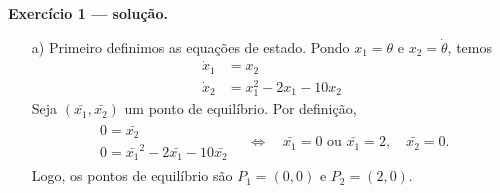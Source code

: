 \noindent
\textbf{\sffamily Exercício 1 --- solução.}
\begin{itemize}
	\item [a)] 
	Primeiro definimos as equações de estado. 
	Pondo 
	$x_1 = \theta$ e 
	$x_2 = \dot{\theta}$, temos 
	\begin{align*}
		\dot{x}_1 &= x_2 \\
		\dot{x}_2 &= x_1^2 - 2x_1 - 10x_2  
	\end{align*}
	Seja $(\bar{x_1}, \bar{x_2})$ um ponto de equilíbrio. Por definição,
	\begin{align*}
		\begin{array}{l}
			0 = \bar{x_2} \\
			0 = \bar{x_1}^2 - 2\bar{x_1} - 10\bar{x_2} 
		\end{array} 
		\quad\iff\quad 
		\bar{x_1} = 0 \text{ ou } \bar{x_1}=2, \quad 
		\bar{x_2} = 0.
	\end{align*}
	Logo, os pontos de equilíbrio são 
	$P_1 = (0, 0)$ e 
	$P_2 = (2, 0)$.
	

\end{itemize}
